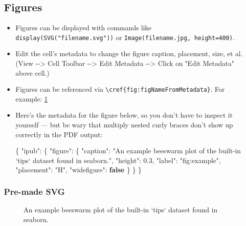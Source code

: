 \documentclass[10pt,parskip=half,
	toc=sectionentrywithdots,
	bibliography=totocnumbered,
	captions=tableheading,
    numbers=noendperiod,
    headings=standardclasses]{scrartcl}
\newenvironment{Shaded}{}{}
\newcommand{\KeywordTok}[1]{\textcolor[rgb]{0.00,0.44,0.13}{\textbf{{#1}}}}
\newcommand{\DataTypeTok}[1]{\textcolor[rgb]{0.56,0.13,0.00}{{#1}}}
\newcommand{\FloatTok}[1]{\textcolor[rgb]{0.25,0.63,0.44}{{#1}}}
\newcommand{\StringTok}[1]{\textcolor[rgb]{0.25,0.44,0.63}{{#1}}}
\newcommand{\FunctionTok}[1]{\textcolor[rgb]{0.02,0.16,0.49}{{#1}}}
\begin{document}
\subsection{Figures}\label{figures}

\begin{itemize}
\item
  Figures can be displayed with commands like
  \texttt{display(SVG("filename.svg"))} or
  \texttt{Image(\textquotesingle{}filename.jpg\textquotesingle{},\ height=400)}.
\item
  Edit the cell's metadata to change the figure caption, placement,
  size, et al. (View -\/-\textgreater{} Cell Toolbar -\/-\textgreater{}
  Edit Metadata -\/-\textgreater{} Click on "Edit Metadata" above cell.)
\item
  Figures can be referenced via
  \texttt{\textbackslash{}cref\{fig:figNameFromMetadata\}}. For example:
  \cref{fig:example}
\item
  Here's the metadata for the figure below, so you don't have to inspect
  it yourself --- but be wary that multiply nested curly braces don't
  show up correctly in the PDF output:

\begin{Shaded}
\begin{Highlighting}[]
\FunctionTok{\{}
\DataTypeTok{"ipub"}\FunctionTok{:} \FunctionTok{\{}
    \DataTypeTok{"figure"}\FunctionTok{:} \FunctionTok{\{}
        \DataTypeTok{"caption"}\FunctionTok{:} \StringTok{"An example beeswarm plot of the built-in `tips` dataset found in seaborn."}\FunctionTok{,}
        \DataTypeTok{"height"}\FunctionTok{:} \FloatTok{0.3}\FunctionTok{,}
        \DataTypeTok{"label"}\FunctionTok{:} \StringTok{"fig:example"}\FunctionTok{,}
        \DataTypeTok{"placement"}\FunctionTok{:} \StringTok{"H"}\FunctionTok{,}
        \DataTypeTok{"widefigure"}\FunctionTok{:} \KeywordTok{false}
    \FunctionTok{\}}
\FunctionTok{\}}
\FunctionTok{\}}
\end{Highlighting}
\end{Shaded}
\end{itemize}

\subsubsection{Pre-made SVG}\label{pre-made-svg}

\begin{figure}[H]\begin{center}\end{center}\caption{An example beeswarm plot of the built-in `tips` dataset found in seaborn.}\label{fig:example}
    \end{figure}
\end{document}
